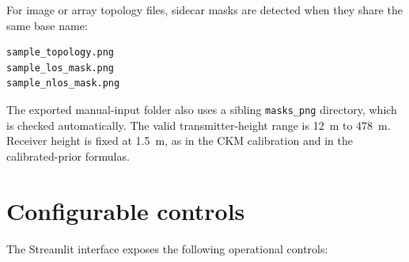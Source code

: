 For image or array topology files, sidecar masks are detected when they share
the same base name:

{\scriptsize
\begin{verbatim}
sample_topology.png
sample_los_mask.png
sample_nlos_mask.png
\end{verbatim}
}

The exported manual-input folder also uses a sibling \texttt{masks\_png}
directory, which is checked automatically. The valid transmitter-height range
is \SI{12}{m} to \SI{478}{m}. Receiver height is fixed at \SI{1.5}{m}, as in
the CKM calibration and in the calibrated-prior formulas.

\section{Configurable controls}

The Streamlit interface exposes the following operational controls:

